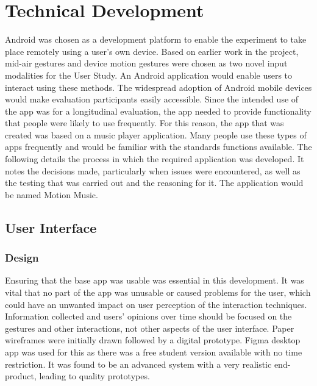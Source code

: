 \documentclass{l4proj}
\begin{document}


\chapter{Technical Development}


Android was chosen as a development platform to enable the experiment to take place remotely using a user's own device. Based on earlier work in the project, mid-air gestures and device motion gestures were chosen as two novel input modalities for the User Study. An Android application would enable users to interact using these methods. The widespread adoption of Android mobile devices would make evaluation participants easily accessible. Since the intended use of the app was for a longitudinal evaluation, the app needed to provide functionality that people were likely to use frequently. For this reason, the app that was created was based on a music player application. Many people use these types of apps frequently and would be familiar with the standards functions available. The following details the process in which the required application was developed. It notes the decisions made, particularly when issues were encountered, as well as the testing that was carried out and the reasoning for it. The application would be named Motion Music.


\section{User Interface}

\subsection{Design}
Ensuring that the base app was usable was essential in this development. It was vital that no part of the app was unusable or caused problems for the user, which could have an unwanted impact on user perception of the interaction techniques. Information collected and users’ opinions over time should be focused on the gestures and other interactions, not other aspects of the user interface. Paper wireframes were initially drawn followed by a digital prototype. Figma desktop app was used for this as there was a free student version available with no time restriction. It was found to be an advanced system with a very realistic end-product, leading to quality prototypes.
\end{document}
